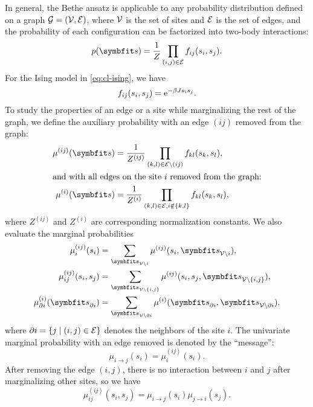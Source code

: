 In general, the Bethe ansatz is applicable to any probability distribution defined on a graph $\mathcal{G} = (\mathcal{V}, \mathcal{E})$, where $\mathcal{V}$ is the set of sites and $\mathcal{E}$ is the set of edges, and the probability of each configuration can be factorized into two-body interactions:
\begin{equation}
p(\vs) = \frac{1}{Z} \prod_{(i, j) \in \calE} f_{i j}(s_i, s_j).
\end{equation}
For the Ising model in \cref{eq:cl-ising}, we have
\begin{equation}
f_{i j}(s_i, s_j) = \mathrm{e}^{-\beta J s_i s_j}.
\end{equation}
To study the properties of an edge or a site while marginalizing the rest of the graph, we define the auxiliary probability with an edge $(i j)$ removed from the graph:
\begin{align}
\mu^{(i j)}(\vs) &= \frac{1}{Z^{(i j)}} \prod_{(k, l) \in \calE \setminus (i j)} f_{k l}(s_k, s_l), \\
\shortintertext{and with all edges on the site $i$ removed from the graph:}
\mu^{(i)}(\vs) &= \frac{1}{Z^{(i)}} \prod_{(k, l) \in \calE, i \notin \{k, l\}} f_{k l}(s_k, s_l),
\end{align}
where $Z^{(i j)}$ and $Z^{(i)}$ are corresponding normalization constants. We also evaluate the marginal probabilities
\begin{align}
\mu^{(i j)}_i(s_i) &= \sum_{\vs_{\calV \setminus i}} \mu^{(i j)}(s_i, \vs_{\calV \setminus i}), \\
\mu^{(i j)}_{i j}(s_i, s_j) &= \sum_{\vs_{\calV \setminus \{i, j\}}} \mu^{(i j)}(s_i, s_j, \vs_{\calV \setminus \{i, j\}}), \\
\mu^{(i)}_{\partial i}(\vs_{\partial i}) &= \sum_{\vs_{\calV \setminus \partial i}} \mu^{(i)}(\vs_{\partial i}, \vs_{\calV \setminus \partial i}),
\end{align}
where $\partial i = \left\{ j \mid (i, j) \in \mathcal{E} \right\}$ denotes the neighbors of the site $i$. The univariate marginal probability with an edge removed is denoted by the ``message'':
\begin{equation}
\mu_{i \to j}(s_i) = \mu^{(i j)}_i(s_i).
\end{equation}
After removing the edge $(i, j)$, there is no interaction between $i$ and $j$ after marginalizing other sites, so we have
\begin{equation}
\mu^{(i j)}_{i j}(s_i, s_j) = \mu_{i \to j}(s_i) \mu_{j \to i}(s_j).
\end{equation}

